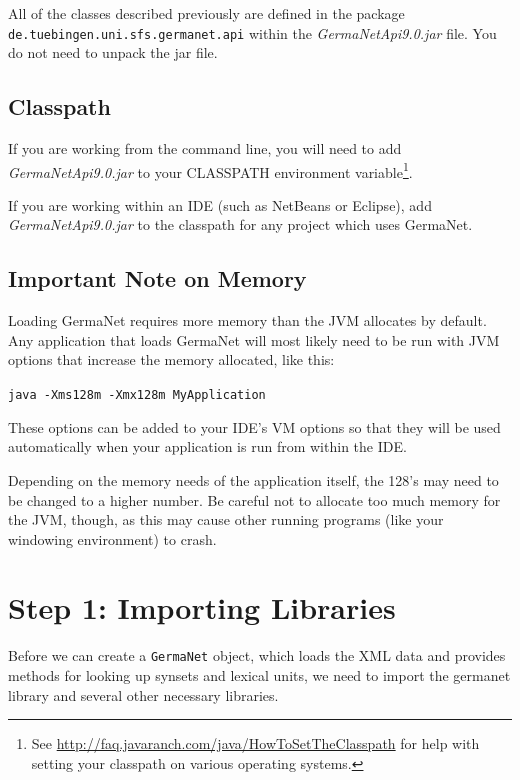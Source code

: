 \documentclass[12pt,a4paper,english,utf8]{report}
\begin{document}
All of the classes described previously are defined in the package \\ \texttt{de.tuebingen.uni.sfs.germanet.api} within the \emph{GermaNetApi9.0.jar} file. You do not need to unpack the jar file.



\subsection{Classpath}
If you are working from the command line, you will need to add \\ \emph{GermaNetApi9.0.jar} to your CLASSPATH environment variable\footnote{See \href{http://faq.javaranch.com/java/HowToSetTheClasspath}{http://faq.javaranch.com/java/HowToSetTheClasspath} for help with setting your classpath on various operating systems.}.

If you are working within an IDE (such as NetBeans or Eclipse), add \emph{GermaNetApi9.0.jar} to the classpath for any project which uses GermaNet.



\subsection{Important Note on Memory}
Loading GermaNet requires more memory than the JVM allocates by default. Any application that loads GermaNet will most likely need to be run with JVM options that increase the memory allocated, like this:

\texttt{java -Xms128m -Xmx128m MyApplication}

These options can be added to your IDE's VM options so that they will be used automatically when your application is run from within the IDE.

Depending on the memory needs of the application itself, the 128's may need to be changed to a higher number. Be careful not to allocate too much memory for the JVM, though, as this may cause other running programs (like your windowing environment) to crash.



\section{Step 1: Importing Libraries}
Before we can create a \texttt{GermaNet} object, which loads the XML data and provides methods for looking up synsets and lexical units, we need to import the germanet library and several other necessary libraries.
\end{document}
